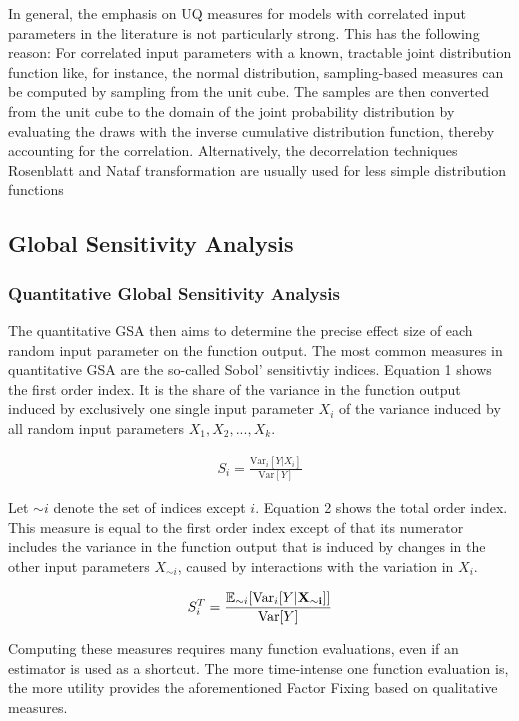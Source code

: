 In general, the emphasis on UQ measures for models with correlated input parameters in the literature is not particularly strong.
This has the following reason: For correlated input parameters with a known, tractable joint distribution function like, for instance, the normal distribution, sampling-based measures can be computed by sampling from the unit cube. The samples are then converted from the unit cube to the domain of the joint probability distribution by evaluating the draws with the inverse cumulative distribution function, thereby accounting for the correlation. Alternatively, the decorrelation techniques Rosenblatt and Nataf transformation are usually used for less simple distribution functions


\subsection{Global Sensitivity Analysis}
\subsubsection{Quantitative Global Sensitivity Analysis}

The quantitative GSA then aims to determine the precise effect size of each random input parameter on the function output. The most common measures in quantitative GSA are the so-called Sobol' sensitivtiy indices. Equation 1 shows the first order index. It is the share of the variance in the function output induced by exclusively one single input parameter $X_i$ of the variance induced by all random input parameters $X_1, X_2, ..., X_k$.


\begin{align}
S_i = \frac{\text{Var}_i[Y|X_i ]}{\text{Var}[Y]}
\end{align}

\noindent
Let $\sim i$ denote the set of indices except $i$. Equation 2 shows the total order index. This measure is equal to the first order index except of that its numerator includes the variance in the function output that is induced by changes in the other input parameters $X_{\sim i}$, caused by interactions with the variation in $X_i$.

\begin{align}
S_{i}^T = \frac{\operatorname*{\mathbb{E}}_{\sim i}[\text{Var}_{i}[Y|\bold{X_{\sim i}]]}}{\text{Var}[Y]}
\end{align}

\noindent
Computing these measures requires many function evaluations, even if an estimator is used as a shortcut. The more time-intense one function evaluation is, the more utility provides the aforementioned Factor Fixing based on qualitative measures. 


